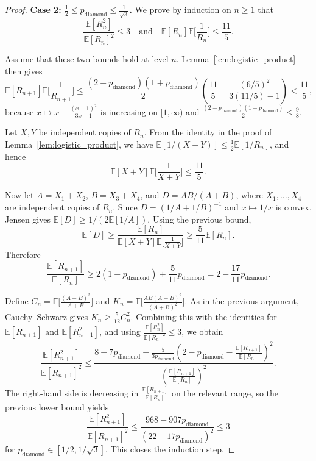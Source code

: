 \documentclass{article}
\theoremstyle{plain}
\theoremstyle{definition}
\begin{document}
\begin{proof}
\textbf{Case 2: $\frac{1}{2}\le p_{\mathrm{diamond}}\le \frac{1}{\sqrt 3}$.}
We prove by induction on $n\ge 1$ that
\[
\frac{\mathbb E[R_n^2]}{\mathbb E[R_n]^2}\le 3
\quad\text{and}\quad
\mathbb E[R_n]\mathbb E\Big[\frac{1}{R_n}\Big]\le \frac{11}{5}.
\]

Assume that these two bounds hold at level $n$.
Lemma~\ref{lem:logistic_product} then gives
\[
\mathbb E[R_{n+1}]\mathbb E\Big[\frac{1}{R_{n+1}}\Big]
\le
\frac{(2-p_{\mathrm{diamond}})(1+p_{\mathrm{diamond}})}{2}
\left(
\frac{11}{5}-\frac{(6/5)^2}{3(11/5)-1}
\right)
<
\frac{11}{5},
\]
because $x\mapsto x-\frac{(x-1)^2}{3x-1}$ is increasing on $[1,\infty)$ and $\frac{(2-p_{\mathrm{diamond}})(1+p_{\mathrm{diamond}})}{2}\le \frac{9}{8}$.

Let $X,Y$ be independent copies of $R_n$.
From the identity in the proof of Lemma~\ref{lem:logistic_product}, we have $\mathbb E[1/(X+Y)]\le \frac{1}{2}\mathbb E[1/R_n]$, and hence
\[
\mathbb E[X+Y]\mathbb E\Big[\frac{1}{X+Y}\Big]\le \frac{11}{5}.
\]

Now let $A=X_1+X_2$, $B=X_3+X_4$, and $D=AB/(A+B)$, where $X_1,\dots,X_4$ are independent copies of $R_n$.
Since $D=(1/A+1/B)^{-1}$ and $x\mapsto 1/x$ is convex, Jensen gives $\mathbb E[D]\ge 1/(2\mathbb E[1/A])$.
Using the previous bound,
\[
\mathbb E[D]
\ge
\frac{\mathbb E[R_n]}{\mathbb E[X+Y]\mathbb E\big[\frac{1}{X+Y}\big]}
\ge
\frac{5}{11}\mathbb E[R_n].
\]
Therefore
\[
\frac{\mathbb E[R_{n+1}]}{\mathbb E[R_n]}
\ge
2(1-p_{\mathrm{diamond}})+\frac{5}{11}p_{\mathrm{diamond}}
=
2-\frac{17}{11}p_{\mathrm{diamond}}.
\]

Define $C_n=\mathbb E\big[\frac{(A-B)^2}{A+B}\big]$ and $K_n=\mathbb E\big[\frac{AB(A-B)^2}{(A+B)^2}\big]$.
As in the previous argument, Cauchy--Schwarz gives $K_n\ge \frac{5}{12}C_n^2$.
Combining this with the identities for $\mathbb E[R_{n+1}]$ and $\mathbb E[R_{n+1}^2]$, and using $\frac{\mathbb E[R_n^2]}{\mathbb E[R_n]^2}\le 3$, we obtain
\[
\frac{\mathbb E[R_{n+1}^2]}{\mathbb E[R_{n+1}]^2}
\le
\frac{
8-7p_{\mathrm{diamond}}
-
\frac{5}{3p_{\mathrm{diamond}}}
\left(
2-p_{\mathrm{diamond}}-\frac{\mathbb E[R_{n+1}]}{\mathbb E[R_n]}
\right)^2
}{
\left(\frac{\mathbb E[R_{n+1}]}{\mathbb E[R_n]}\right)^2
}.
\]
The right-hand side is decreasing in $\frac{\mathbb E[R_{n+1}]}{\mathbb E[R_n]}$ on the relevant range, so the previous lower bound yields
\[
\frac{\mathbb E[R_{n+1}^2]}{\mathbb E[R_{n+1}]^2}
\le
\frac{968-907p_{\mathrm{diamond}}}{(22-17p_{\mathrm{diamond}})^2}
\le 3
\]
for $p_{\mathrm{diamond}}\in[1/2,1/\sqrt 3]$.
This closes the induction step.


\end{proof}
\end{document}
